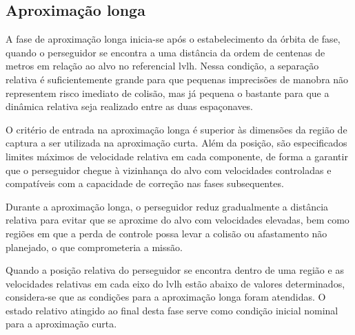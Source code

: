 \subsection{Aproximação longa}
\label{sec:aproximacao_longa}

A fase de aproximação longa inicia-se após o estabelecimento da órbita de fase, quando o perseguidor se encontra a uma distância da ordem de centenas de metros em relação ao alvo no referencial \gls{lvlh}.
Nessa condição, a separação relativa é suficientemente grande para que pequenas imprecisões de manobra não representem risco imediato de colisão, mas já pequena o bastante para que a dinâmica relativa seja realizado entre as duas espaçonaves.

O critério de entrada na aproximação longa é superior às dimensões da região de captura a ser utilizada na aproximação curta.
Além da posição, são especificados limites máximos de velocidade relativa em cada componente, de forma a garantir que o perseguidor chegue à vizinhança do alvo com velocidades controladas e compatíveis com a capacidade de correção nas fases subsequentes.

Durante a aproximação longa, o perseguidor reduz gradualmente a distância relativa para evitar que se aproxime do alvo com velocidades elevadas, bem como regiões em que a perda de controle possa levar a colisão ou afastamento não planejado, o que comprometeria a missão.

Quando a posição relativa do perseguidor se encontra dentro de uma região e as velocidades relativas em cada eixo do \gls{lvlh} estão abaixo de valores determinados, considera-se que as condições para a aproximação longa foram atendidas.
O estado relativo atingido ao final desta fase serve como condição inicial nominal para a aproximação curta.
